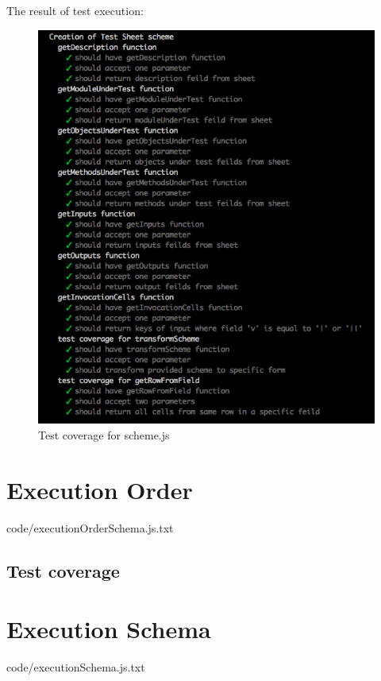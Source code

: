The result of test execution:
\begin{figure}[H]
	\centering
	\includegraphics[width=\linewidth]{grafiken/testScheme.png}
	\caption{Test coverage for scheme.js}
	\label{fig:testScheme}
\end{figure}

\section{Execution Order}

{code/executionOrderSchema.js.txt}
\subsection{Test coverage}

\section{Execution Schema}

{code/executionSchema.js.txt}
